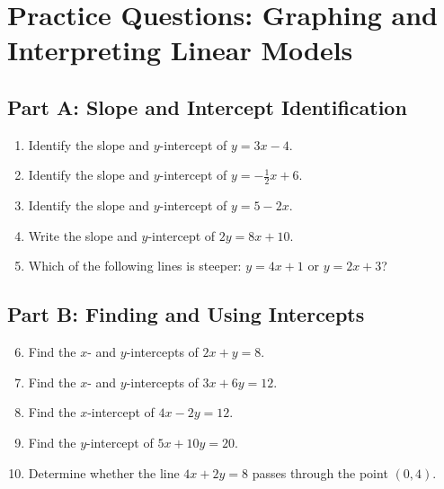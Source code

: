 \documentclass[14pt]{extarticle}
\begin{document}
\newpage


\section*{Practice Questions: Graphing and Interpreting Linear Models}

\subsection*{Part A: Slope and Intercept Identification}
\begin{enumerate}
    \item Identify the slope and \(y\)-intercept of \(y = 3x - 4\).
    \item Identify the slope and \(y\)-intercept of \(y = -\tfrac{1}{2}x + 6\).
    \item Identify the slope and \(y\)-intercept of \(y = 5 - 2x\).
    \item Write the slope and \(y\)-intercept of \(2y = 8x + 10\).
    \item Which of the following lines is steeper: \(y = 4x + 1\) or \(y = 2x + 3\)?
\end{enumerate}

\subsection*{Part B: Finding and Using Intercepts}
\begin{enumerate}
    \setcounter{enumi}{5}
    \item Find the \(x\)- and \(y\)-intercepts of \(2x + y = 8\).
    \item Find the \(x\)- and \(y\)-intercepts of \(3x + 6y = 12\).
    \item Find the \(x\)-intercept of \(4x - 2y = 12\).
    \item Find the \(y\)-intercept of \(5x + 10y = 20\).
    \item Determine whether the line \(4x + 2y = 8\) passes through the point \((0,4)\).
\end{enumerate}
\end{document}
